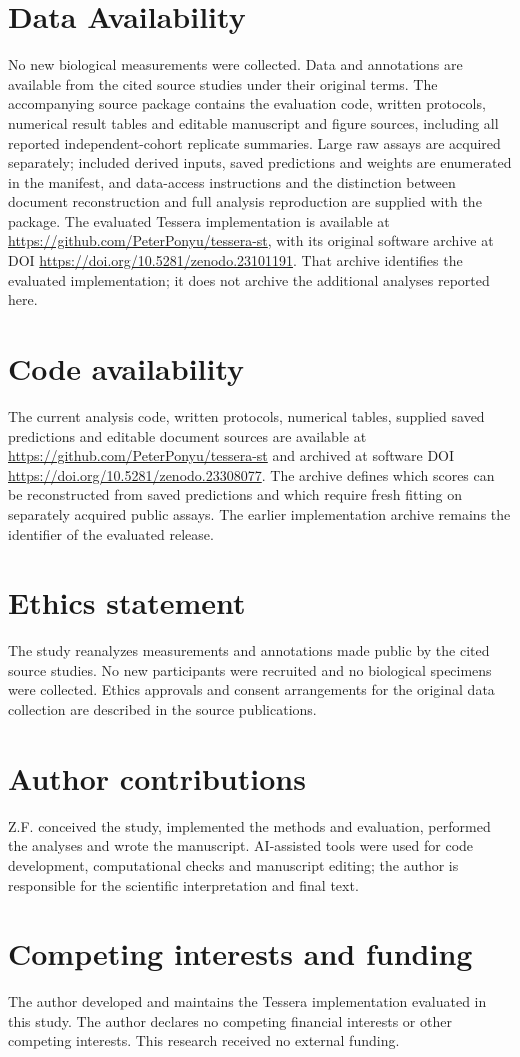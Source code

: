 \documentclass[11pt]{article}
\begin{document}
\section*{Data Availability}
No new biological measurements were collected. Data and annotations are available from the cited source studies under their original terms. The accompanying source package contains the evaluation code, written protocols, numerical result tables and editable manuscript and figure sources, including all reported independent-cohort replicate summaries. Large raw assays are acquired separately; included derived inputs, saved predictions and weights are enumerated in the manifest, and data-access instructions and the distinction between document reconstruction and full analysis reproduction are supplied with the package. The evaluated Tessera implementation is available at \url{https://github.com/PeterPonyu/tessera-st}, with its original software archive at DOI \url{https://doi.org/10.5281/zenodo.23101191}. That archive identifies the evaluated implementation; it does not archive the additional analyses reported here.


\section*{Code availability}
The current analysis code, written protocols, numerical tables, supplied saved predictions and editable document sources are available at \url{https://github.com/PeterPonyu/tessera-st} and archived at software DOI \url{https://doi.org/10.5281/zenodo.23308077}. The archive defines which scores can be reconstructed from saved predictions and which require fresh fitting on separately acquired public assays. The earlier implementation archive remains the identifier of the evaluated release.
\section*{Ethics statement}
The study reanalyzes measurements and annotations made public by the cited source studies. No new participants were recruited and no biological specimens were collected. Ethics approvals and consent arrangements for the original data collection are described in the source publications.

\section*{Author contributions}
Z.F. conceived the study, implemented the methods and evaluation, performed the analyses and wrote the manuscript. AI-assisted tools were used for code development, computational checks and manuscript editing; the author is responsible for the scientific interpretation and final text.
\section*{Competing interests and funding}
The author developed and maintains the Tessera implementation evaluated in this study. The author declares no competing financial interests or other competing interests. This research received no external funding.
{\small\setlength{\bibsep}{2pt}\par}
\end{document}
